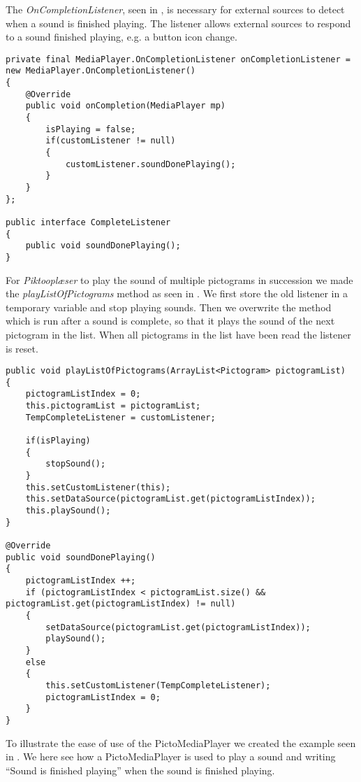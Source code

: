 The \textit{OnCompletionListener}, seen in , is necessary for external sources to detect when a sound is finished playing. The listener allows external sources to respond to a sound finished playing, e.g. a button icon change.

\begin{lstlisting}[caption={onCompletionListener method of PictoMediaPlayer.}, label={lst:completelistener}]
private final MediaPlayer.OnCompletionListener onCompletionListener = new MediaPlayer.OnCompletionListener()
{
    @Override
    public void onCompletion(MediaPlayer mp) 
    {
        isPlaying = false;
        if(customListener != null)
        {
            customListener.soundDonePlaying();
        }
    }
};

public interface CompleteListener
{
    public void soundDonePlaying();
}
\end{lstlisting}

For \textit{Piktooplæser} to play the sound of multiple pictograms in succession we made the \textit{playListOfPictograms} method as seen in . 
We first store the old listener in a temporary variable and stop playing sounds. Then we overwrite the method which is run after a sound is complete, so that it plays the sound of the next pictogram in the list. When all pictograms in the list have been read the listener is reset. %

\begin{lstlisting}[caption={playListOfPictograms method of PictoMediaPlayer.}, label={lst:playlist}]
public void playListOfPictograms(ArrayList<Pictogram> pictogramList)
{
    pictogramListIndex = 0;
    this.pictogramList = pictogramList;
    TempCompleteListener = customListener;

    if(isPlaying)
    {
        stopSound();
    }
    this.setCustomListener(this);
    this.setDataSource(pictogramList.get(pictogramListIndex));
    this.playSound();
}

@Override
public void soundDonePlaying()
{
    pictogramListIndex ++;
    if (pictogramListIndex < pictogramList.size() && pictogramList.get(pictogramListIndex) != null)
    {
        setDataSource(pictogramList.get(pictogramListIndex));
        playSound();
    }
    else
    {
        this.setCustomListener(TempCompleteListener);
        pictogramListIndex = 0;
    }
}
\end{lstlisting}

To illustrate the ease of use of the PictoMediaPlayer we created the example seen in . 
We here see how a PictoMediaPlayer is used to play a sound and writing ``Sound is finished playing'' when the sound is finished playing.

